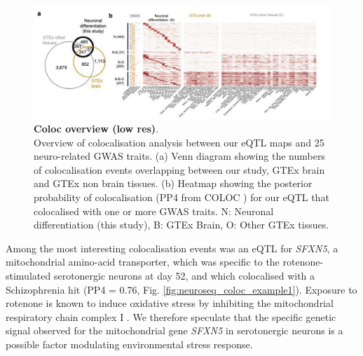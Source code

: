 \begin{figure}[h]
\centering
\includegraphics[width=16cm]{Chapter5/Fig/neuroseq_coloc_overview.png}
\caption[Coloc overview]{\textbf{Coloc overview (low res)}.\\
Overview of colocalisation analysis between our eQTL maps and 25 neuro-related GWAS traits. 
(a) Venn diagram showing the numbers of colocalisation events overlapping between our study, GTEx brain and GTEx non brain tissues. 
(b) Heatmap showing the posterior probability of colocalisation (PP4 from COLOC \cite{giambartolomei2014bayesian}) for our eQTL that colocalised with one or more GWAS traits. 
N: Neuronal differentiation (this study), B: GTEx Brain, O: Other GTEx tissues.}
\label{fig:neuroseq_coloc_overview}
\end{figure}

\newpage

Among the most interesting colocalisation events was an eQTL for \textit{SFXN5}, a mitochondrial amino-acid transporter, which was specific to the rotenone-stimulated serotonergic neurons at day 52, and which colocalised with a Schizophrenia hit (PP4 = 0.76, Fig. \ref{fig:neuroseq_coloc_example1}). 
Exposure to rotenone is known to induce oxidative stress by inhibiting the mitochondrial respiratory chain complex I \cite{palmer1968studies, betarbet2000chronic}. 
We therefore speculate that the specific genetic signal observed for the mitochondrial gene \textit{SFXN5} in serotonergic neurons is a possible factor modulating environmental stress response.\\

